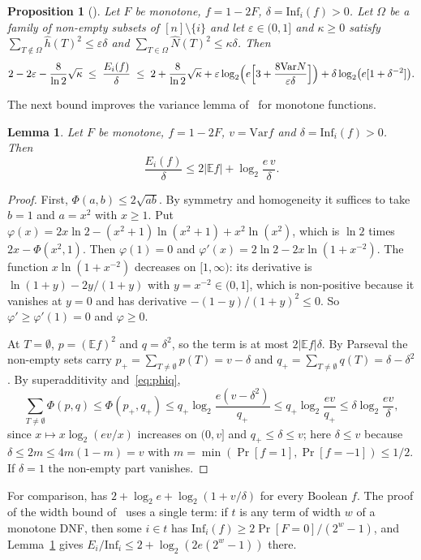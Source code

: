 \documentclass[11pt]{amsart}
\newtheorem{lemma}[theorem]{Lemma}
\newtheorem{proposition}[theorem]{Proposition}
\theoremstyle{remark}
\newcommand{\Inf}{\mathrm{Inf}}
\newcommand{\Var}{\mathrm{Var}}
\newcommand{\E}{\mathbb{E}}
\begin{document}
\begin{proposition}[{\cite[Proposition~2]{Shm6}}]\label{prop:sep}
Let $F$ be monotone, $f=1-2F$, $\delta=\Inf_i(f)>0$. Let $\Omega$ be a family of non-empty subsets of
$[n]\setminus\{i\}$ and let $\varepsilon\in(0,1]$ and $\kappa\ge0$ satisfy $\sum_{T\notin\Omega}\hat h(T)^2\le
\varepsilon\delta$ and $\sum_{T\in\Omega}\hat N(T)^2\le\kappa\delta$. Then
\[
2-2\varepsilon-\frac{8}{\ln2}\sqrt\kappa\;\le\;\frac{E_i(f)}{\delta}\;\le\;2+\frac{8}{\ln2}\sqrt\kappa
+\varepsilon\log_2\Bigl(e\Bigl[3+\frac{8\Var N}{\varepsilon\delta}\Bigr]\Bigr)+\delta\log_2\bigl(e[1+\delta^{-2}]\bigr).
\]
\end{proposition}

The next bound improves the variance lemma of~\cite{Shm3} for monotone functions.

\begin{lemma}\label{lem:rel}
Let $F$ be monotone, $f=1-2F$, $v=\Var f$ and $\delta=\Inf_i(f)>0$. Then
\[
\frac{E_i(f)}{\delta}\le2|\E f|+\log_2\frac{e\,v}{\delta}.
\]
\end{lemma}

\begin{proof}
First, $\Phi(a,b)\le2\sqrt{ab}$. By symmetry and homogeneity it suffices to take $b=1$ and $a=x^2$ with $x\ge1$. Put
$\varphi(x)=2x\ln2-(x^2+1)\ln(x^2+1)+x^2\ln(x^2)$, which is $\ln2$ times $2x-\Phi(x^2,1)$. Then $\varphi(1)=0$ and
$\varphi'(x)=2\ln2-2x\ln(1+x^{-2})$. The function $x\ln(1+x^{-2})$ decreases on $[1,\infty)$: its derivative is
$\ln(1+y)-2y/(1+y)$ with $y=x^{-2}\in(0,1]$, which is non-positive because it vanishes at $y=0$ and has derivative
$-(1-y)/(1+y)^2\le0$. So $\varphi'\ge\varphi'(1)=0$ and $\varphi\ge0$.

At $T=\emptyset$, $p=(\E f)^2$ and $q=\delta^2$, so the term is at most $2|\E f|\delta$. By Parseval the non-empty
sets carry $p_+=\sum_{T\neq\emptyset}p(T)=v-\delta$ and $q_+=\sum_{T\ne\emptyset}q(T)=\delta-\delta^2$. By superadditivity
and~\eqref{eq:phiq},
\[
\sum_{T\ne\emptyset}\Phi(p,q)\le\Phi(p_+,q_+)\le q_+\log_2\frac{e(v-\delta^2)}{q_+}\le q_+\log_2\frac{ev}{q_+}\le\delta\log_2\frac{ev}\delta,
\]
since $x\mapsto x\log_2(ev/x)$ increases on $(0,v]$ and $q_+\le\delta\le v$; here $\delta\le v$ because
$\delta\le2m\le4m(1-m)=v$ with $m=\min(\Pr[f=1],\Pr[f=-1])\le1/2$. If $\delta=1$ the non-empty part vanishes.
\end{proof}

For comparison, \cite{Shm3} has $2+\log_2e+\log_2(1+v/\delta)$ for every Boolean $f$. The proof of the width bound
of~\cite{Shm3} uses a single term: if $t$ is any term of width $w$ of a monotone DNF, then some $i\in t$ has
$\Inf_i(f)\ge2\Pr[F=0]/(2^w-1)$, and Lemma~\ref{lem:rel} gives $E_i/\Inf_i\le2+\log_2(2e(2^w-1))$ there.
\end{document}
